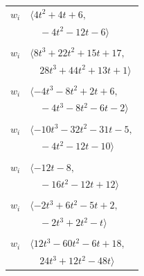 \documentclass[11pt]{article}
\begin{document}
\begin{longtable}{@{}ll@{}}
$w_i$ & $\langle 4t^{2}+4t+6,$\\
 & $\quad -4t^{2}-12t-6\rangle$\\
\addlinespace[2pt]
\multicolumn{2}{@{}p{0.97\textwidth}@{}}{$i=32$, $D_i=1$, $\rho_{ij}$: $3{:}3, \allowbreak 6{:}2, \allowbreak 8{:}2, \allowbreak 24{:}2, \allowbreak 25{:}3, \allowbreak 33{:}3, \allowbreak 41{:}3$}\\
$w_i$ & $\langle 8t^{3}+22t^{2}+15t+17,$\\
 & $\quad 28t^{3}+44t^{2}+13t+1\rangle$\\
\addlinespace[2pt]
\multicolumn{2}{@{}p{0.97\textwidth}@{}}{$i=33$, $D_i=1$, $\rho_{ij}$: $4{:}1, \allowbreak 10{:}2, \allowbreak 18{:}2, \allowbreak 20{:}3, \allowbreak 22{:}1, \allowbreak 26{:}3, \allowbreak 32{:}1, \allowbreak 46{:}2$}\\
$w_i$ & $\langle -4t^{3}-8t^{2}+2t+6,$\\
 & $\quad -4t^{3}-8t^{2}-6t-2\rangle$\\
\addlinespace[2pt]
\multicolumn{2}{@{}p{0.97\textwidth}@{}}{$i=34$, $D_i=1$, $\rho_{ij}$: $0{:}1, \allowbreak 4{:}3, \allowbreak 14{:}1, \allowbreak 18{:}3, \allowbreak 20{:}3, \allowbreak 29{:}1$}\\
$w_i$ & $\langle -10t^{3}-32t^{2}-31t-5,$\\
 & $\quad -4t^{2}-12t-10\rangle$\\
\addlinespace[2pt]
\multicolumn{2}{@{}p{0.97\textwidth}@{}}{$i=35$, $D_i=1$, $\rho_{ij}$: $6{:}1, \allowbreak 19{:}3, \allowbreak 21{:}1, \allowbreak 23{:}3, \allowbreak 38{:}1, \allowbreak 41{:}3, \allowbreak 46{:}2$}\\
$w_i$ & $\langle -12t-8,$\\
 & $\quad -16t^{2}-12t+12\rangle$\\
\addlinespace[2pt]
\multicolumn{2}{@{}p{0.97\textwidth}@{}}{$i=36$, $D_i=1$, $\rho_{ij}$: $2{:}2, \allowbreak 7{:}2, \allowbreak 18{:}2, \allowbreak 19{:}2, \allowbreak 20{:}2, \allowbreak 25{:}2, \allowbreak 38{:}2$}\\
$w_i$ & $\langle -2t^{3}+6t^{2}-5t+2,$\\
 & $\quad -2t^{3}+2t^{2}-t\rangle$\\
\addlinespace[2pt]
\multicolumn{2}{@{}p{0.97\textwidth}@{}}{$i=37$, $D_i=1$, $\rho_{ij}$: $14{:}3, \allowbreak 18{:}3, \allowbreak 22{:}1, \allowbreak 23{:}1, \allowbreak 39{:}3, \allowbreak 40{:}1$}\\
$w_i$ & $\langle 12t^{3}-60t^{2}-6t+18,$\\
 & $\quad 24t^{3}+12t^{2}-48t\rangle$\\

\end{longtable}
\end{document}
